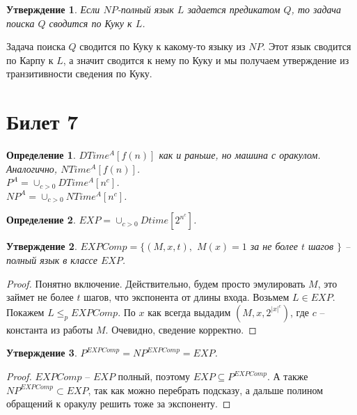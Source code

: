 \documentclass[12pt, letterpaper]{article}
\newtheorem{prop}{Утверждение}[section]
\newtheorem{defi}{Определение}[section]
\newcommand{\leqp}{\leq_{p}}
\begin{document}
\begin{prop}
Если $NP$-полный язык $L$ задается предикатом $Q$, то задача поиска $Q$ сводится по Куку к $L$.
\end{prop}
Задача поиска $Q$ сводится по Куку к какому-то языку из $NP$. Этот язык сводится по Карпу к $L$, а значит сводится к нему по Куку и мы получаем утверждение из транзитивности сведения по Куку.

\section{Билет 7}
\begin{defi}
$DTime^A[f(n)]$ как и раньше, но машина с оракулом. Аналогично, $NTime^A[f(n)]$.\\
$P^A = \cup_{c>0} DTime^A[n^c]$.\\
$NP^A = \cup_{c>0} NTime^A[n^c]$.\\
\end{defi}

\begin{defi}
$EXP = \cup_{c>0} Dtime[2^{n^c}]$. 
\end{defi}

\begin{prop}
$EXPComp = \{(M, x, t), $ $M(x)=1$ за не более $t$ шагов $\}$ -- полный язык в классе $EXP$.
\end{prop}
\begin{proof}
Понятно включение. Действительно, будем просто эмулировать $M$, это займет не более $t$ шагов, что экспонента от длины входа. Возьмем $L \in EXP$. Покажем $L \leqp EXPComp$. По $x$ как всегда выдадим $(M, x, 2^{|x|^c})$, где $c$ -- константа из работы $M$. Очевидно, сведение корректно.
\end{proof}

\begin{prop}
$P^{EXPComp} = NP^{EXPComp} = EXP$.
\end{prop}
\begin{proof}
$EXPComp$ -- $EXP$ полный, поэтому $EXP \subseteq P^{EXPComp}$. А также $NP^{EXPComp} \subset EXP$, так как можно перебрать подсказу, а дальше полином обращений к оракулу решить тоже за экспоненту.
\end{proof}
\end{document}
